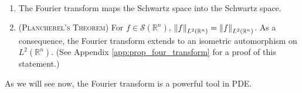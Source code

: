 \documentclass{article}
\numberwithin{equation}{section}
\begin{document}
	\begin{theorem}
		\label{thm:prop_four_transform} $ $\newline \vspace{-0.65cm}
		\begin{enumerate}[itemsep =-2pt,label = (\arabic{*})]
			\item The Fourier transform maps the Schwartz space into the Schwartz space. 
			\item (\textsc{Plancherel's Theorem}) For $f \in \mathcal{S}(\mathbb{R}^{n})$, $\left\Vert f \right\Vert_{L^{2}(\mathbb{R}^{n})} = \left\Vert f \right\Vert_{L^{2}(\mathbb{R}^{n})}$. As a consequence, the Fourier transform extends to an isometric automorphism on $L^{2}(\mathbb{R}^{n})$. (See Appendix \ref{app:prop_four_transform} for a proof of this statement.)
		\end{enumerate}
	\end{theorem}
	
	As we will see now, the Fourier transform is a powerful tool in PDE. 
	
\end{document}
